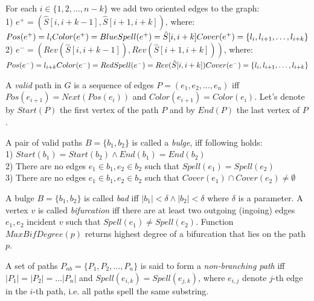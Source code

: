 \documentclass[a4paper, 12pt]{scrartcl}
\begin{document}
For each \(i \in \lbrace{1, 2, \ldots, n - k} \rbrace \) we add two oriented edges to the graph: \\
1) \(e^+ = (\hat{S}[i, i + k - 1], \hat{S}[i + 1, i + k]) \), where: \\
\(Pos(e^+) = l_i \\
Color(e^+) = Blue \\
Spell(e^+) = \hat{S}[i, i + k] \\
Cover(e^+) =  \lbrace l_i, l_{i + 1}, \ldots, l_{i + k} \rbrace \) \\
2) \(e^- = (Rev(\hat{S}[i, i + k - 1]), Rev(\hat{S}[i + 1, i + k]))\), where: \\
\(Pos(e^-) = l_{i + k} \\
Color(e^-) = Red \\
Spell(e^-) = Rev(\hat{S}[i, i + k]) \\
Cover(e^-) =  \lbrace l_i, l_{i + 1}, \ldots, l_{i + k} \rbrace \)

A \textit{valid} path in \(G\) is a sequence of edges \(P = (e_{1}, e_{2}, \ldots, e_{n})\) iff \(Pos(e_{i+1})  = Next(Pos(e_{i}))\) and
\(Color(e_{i + 1}) = Color(e_{i})\). Let's denote by \(Start(P)\) the first vertex of the path \(P\) and by \(End(P)\) the last vertex of \(P\).

A pair of valid paths \(B =\lbrace b_{1}, b_{2} \rbrace \)
is called a \textit{bulge}, iff following holds: \\
1) \(Start(b_{1}) = Start(b_{2}) \wedge End(b_{1}) = End(b_{2}) \) \\
2) There are no edges \(e_{1} \in b_{1}, e_{2} \in b_{2} \) such that \(Spell(e_{1}) = Spell(e_{2})\) \\
3) There are no edges \(e_{1} \in b_{1}, e_{2} \in b_{2} \) such that \(Cover(e_{1}) \cap Cover(e_{2}) \neq \emptyset\)

A bulge \(B =\lbrace b_{1}, b_{2} \rbrace \) is called \textit{bad} iff \(|b_1| < \delta \wedge |b_2| < \delta\) where \(\delta\) is a parameter.
A vertex \(v\) is called \textit{bifurcation} iff there are at least two outgoing (ingoing) edges \(e_{1}, e_{2}\) 
incident \(v\) such that \(Spell(e_{1}) \neq Spell(e_{2})\). Function \(MaxBifDegree(p)\) returns highest degree of a bifurcation that lies
on the path \(p\).

A set of paths \(P_{nb} = \lbrace P_{1}, P_{2}, \ldots, P_{n} \rbrace\)
is said to form a \textit{non-branching path} iff \(|P_{1}| = |P_{2}| = \ldots |P_{n}| \) and \(Spell(e_{i, k}) = Spell(e_{j, k}) \),
where \(e_{i, j}\) denote \(j\)-th edge in the \(i\)-th path, i.e. all paths spell the same substring.
\end{document}
